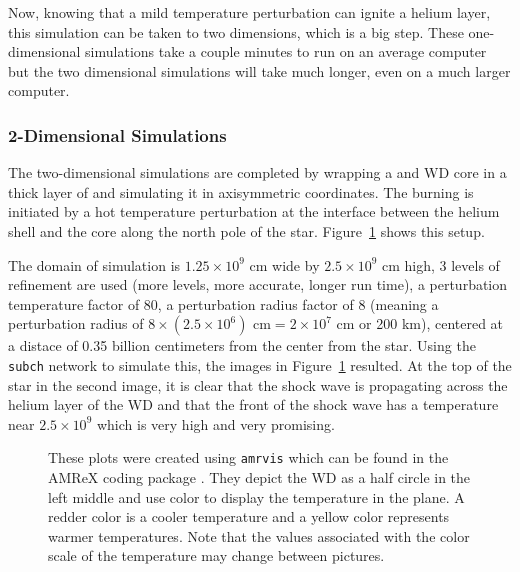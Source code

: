 \documentclass[preprint]{aastex62}
\begin{document}
      Now, knowing that a mild temperature perturbation can ignite a helium layer, this simulation can be taken to two dimensions, which is a big step. These one-dimensional simulations take a couple minutes to run on an average computer but the two dimensional simulations will take much longer, even on a much larger computer. 
        
    \subsubsection{2-Dimensional Simulations}
  
      The two-dimensional simulations are completed by wrapping a  and  WD core in a thick layer of  and simulating it in axisymmetric coordinates. The burning is initiated by a hot temperature perturbation at the interface between the helium shell and the core along the north pole of the star. Figure~\ref{fig:subchsims} shows this setup. 
      
      \newpage
      
      The domain of simulation is $1.25 \times 10^9$ cm wide by $2.5 \times 10^9$ cm high, 3 levels of refinement are used (more levels, more accurate, longer run time), a perturbation temperature factor of 80, a perturbation radius factor of 8 (meaning a perturbation radius of $8 \times (2.5 \times 10^6) \text{ cm} = 2 \times 10^7 \text{ cm}$ or 200 km), centered at a distace of 0.35 billion centimeters from the center from the star. Using the {\tt subch} network to simulate this, the images in Figure~\ref{fig:subchsims} resulted. At the top of the star in the second image, it is clear that the shock wave is propagating across the helium layer of the WD and that the front of the shock wave has a temperature near $2.5 \times 10^9$ which is very high and very promising. 
      
      \begin{figure}
        \caption{These plots were created using {\tt amrvis} which can be found in the AMReX coding package \citep{AMREXcodes}. They depict the WD as a half circle in the left middle and use color to display the temperature in the plane. A redder color is a cooler temperature and a yellow color represents warmer temperatures. Note that the values associated with the color scale of the temperature may change between pictures. 
          }
        \label{fig:subchsims}
      \end{figure}
\end{document}

